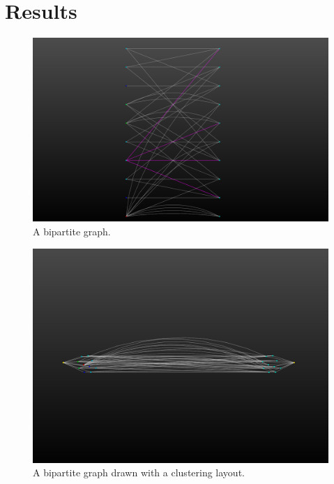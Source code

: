 \documentclass[11pt]{article}
\begin{document}
\section{Results}
    \begin{figure}[H]
        \centering
        \includegraphics[width=\textwidth]{screen_shots/bipartite.png}
        \caption{A bipartite graph.}
    \end{figure}
    \begin{figure}[H]
        \centering
        \includegraphics[width=\textwidth]{screen_shots/bipartite_cluster.png}
        \caption{A bipartite graph drawn with a clustering layout.}
    \end{figure}
\end{document}
